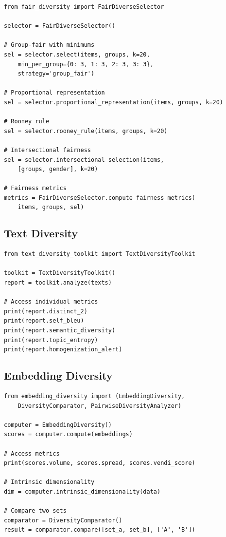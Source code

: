 \documentclass[11pt]{article}
\begin{document}
\begin{verbatim}
from fair_diversity import FairDiverseSelector

selector = FairDiverseSelector()

# Group-fair with minimums
sel = selector.select(items, groups, k=20,
    min_per_group={0: 3, 1: 3, 2: 3, 3: 3},
    strategy='group_fair')

# Proportional representation
sel = selector.proportional_representation(items, groups, k=20)

# Rooney rule
sel = selector.rooney_rule(items, groups, k=20)

# Intersectional fairness
sel = selector.intersectional_selection(items,
    [groups, gender], k=20)

# Fairness metrics
metrics = FairDiverseSelector.compute_fairness_metrics(
    items, groups, sel)
\end{verbatim}

\subsection{Text Diversity}

\begin{verbatim}
from text_diversity_toolkit import TextDiversityToolkit

toolkit = TextDiversityToolkit()
report = toolkit.analyze(texts)

# Access individual metrics
print(report.distinct_2)
print(report.self_bleu)
print(report.semantic_diversity)
print(report.topic_entropy)
print(report.homogenization_alert)
\end{verbatim}

\subsection{Embedding Diversity}

\begin{verbatim}
from embedding_diversity import (EmbeddingDiversity,
    DiversityComparator, PairwiseDiversityAnalyzer)

computer = EmbeddingDiversity()
scores = computer.compute(embeddings)

# Access metrics
print(scores.volume, scores.spread, scores.vendi_score)

# Intrinsic dimensionality
dim = computer.intrinsic_dimensionality(data)

# Compare two sets
comparator = DiversityComparator()
result = comparator.compare([set_a, set_b], ['A', 'B'])
\end{verbatim}
\end{document}
